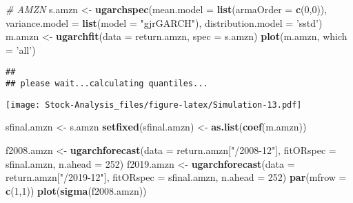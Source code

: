 \documentclass[
]{article}
\newenvironment{Shaded}{\begin{snugshade}}{\end{snugshade}}
\newcommand{\CommentTok}[1]{\textcolor[rgb]{0.56,0.35,0.01}{\textit{#1}}}
\newcommand{\DataTypeTok}[1]{\textcolor[rgb]{0.13,0.29,0.53}{#1}}
\newcommand{\DecValTok}[1]{\textcolor[rgb]{0.00,0.00,0.81}{#1}}
\newcommand{\KeywordTok}[1]{\textcolor[rgb]{0.13,0.29,0.53}{\textbf{#1}}}
\newcommand{\NormalTok}[1]{#1}
\newcommand{\StringTok}[1]{\textcolor[rgb]{0.31,0.60,0.02}{#1}}
\begin{document}
\begin{Shaded}
\begin{Highlighting}[]
\CommentTok{# AMZN}
\NormalTok{s.amzn <-}\StringTok{ }\KeywordTok{ugarchspec}\NormalTok{(}\DataTypeTok{mean.model =} \KeywordTok{list}\NormalTok{(}\DataTypeTok{armaOrder =} \KeywordTok{c}\NormalTok{(}\DecValTok{0}\NormalTok{,}\DecValTok{0}\NormalTok{)),}
                \DataTypeTok{variance.model =} \KeywordTok{list}\NormalTok{(}\DataTypeTok{model =} \StringTok{"gjrGARCH"}\NormalTok{),}
                \DataTypeTok{distribution.model =} \StringTok{'sstd'}\NormalTok{)}
\NormalTok{m.amzn <-}\StringTok{ }\KeywordTok{ugarchfit}\NormalTok{(}\DataTypeTok{data =}\NormalTok{ return.amzn, }\DataTypeTok{spec =}\NormalTok{ s.amzn)}
\KeywordTok{plot}\NormalTok{(m.amzn, }\DataTypeTok{which =} \StringTok{'all'}\NormalTok{)}
\end{Highlighting}
\end{Shaded}

\begin{verbatim}
## 
## please wait...calculating quantiles...
\end{verbatim}

\texttt{[image: Stock-Analysis\_files/figure-latex/Simulation-13.pdf]}

\begin{Shaded}
\begin{Highlighting}[]
\NormalTok{sfinal.amzn <-}\StringTok{ }\NormalTok{s.amzn}
\KeywordTok{setfixed}\NormalTok{(sfinal.amzn) <-}\StringTok{ }\KeywordTok{as.list}\NormalTok{(}\KeywordTok{coef}\NormalTok{(m.amzn))}

\NormalTok{f2008.amzn <-}\StringTok{ }\KeywordTok{ugarchforecast}\NormalTok{(}\DataTypeTok{data =}\NormalTok{ return.amzn[}\StringTok{"/2008-12"}\NormalTok{],}
                        \DataTypeTok{fitORspec =}\NormalTok{ sfinal.amzn,}
                        \DataTypeTok{n.ahead =} \DecValTok{252}\NormalTok{)}
\NormalTok{f2019.amzn <-}\StringTok{ }\KeywordTok{ugarchforecast}\NormalTok{(}\DataTypeTok{data =}\NormalTok{ return.amzn[}\StringTok{"/2019-12"}\NormalTok{],}
                        \DataTypeTok{fitORspec =}\NormalTok{ sfinal.amzn,}
                        \DataTypeTok{n.ahead =} \DecValTok{252}\NormalTok{)}
\KeywordTok{par}\NormalTok{(}\DataTypeTok{mfrow =} \KeywordTok{c}\NormalTok{(}\DecValTok{1}\NormalTok{,}\DecValTok{1}\NormalTok{))}
\KeywordTok{plot}\NormalTok{(}\KeywordTok{sigma}\NormalTok{(f2008.amzn))}
\end{Highlighting}
\end{Shaded}
\end{document}
